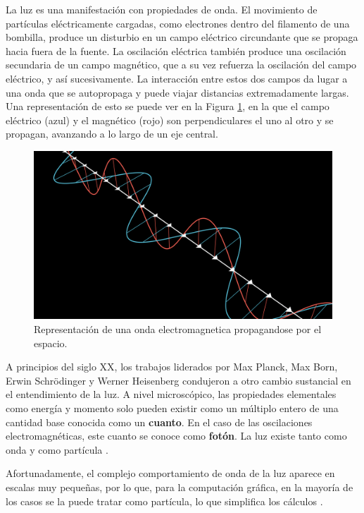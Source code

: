 La luz es una manifestación con propiedades de onda.
El movimiento de partículas eléctricamente cargadas, como electrones dentro del filamento de una bombilla, produce un disturbio en un campo eléctrico circundante que se propaga hacia fuera de la fuente.
La oscilación eléctrica también produce una oscilación secundaria de un campo magnético, que a su vez refuerza la oscilación del campo eléctrico, y así sucesivamente.
La interacción entre estos dos campos da lugar a una onda que se autopropaga y puede viajar distancias extremadamente largas.
Una representación de esto se puede ver en la Figura \ref{fig:electromagnetic-wave}, en la que el campo eléctrico (azul) y el magnético (rojo) son perpendiculares el uno al otro y se propagan, avanzando a lo largo de un eje central.

\begin{figure}[t]
    \centering
    \includegraphics[width=\textwidth]{electromagnetic_wave.png}
    \caption{Representación de una onda electromagnetica propagandose por el espacio.}
    \label{fig:electromagnetic-wave}
\end{figure}

A principios del siglo XX, los trabajos liderados por Max Planck, Max Born, Erwin Schrödinger y Werner Heisenberg condujeron a otro cambio sustancial en el entendimiento de la luz.
A nivel microscópico, las propiedades elementales como energía y momento solo pueden existir como un múltiplo entero de una cantidad base conocida como un \textbf{cuanto}.
En el caso de las oscilaciones electromagnéticas, este cuanto se conoce como \textbf{fotón}.
La luz existe tanto como onda y como partícula \cite{quantum-light}.

Afortunadamente, el complejo comportamiento de onda de la luz aparece en escalas muy pequeñas, por lo que, para la computación gráfica, en la mayoría de los casos se la puede tratar como partícula, lo que simplifica los cálculos \cite{pbr}.

